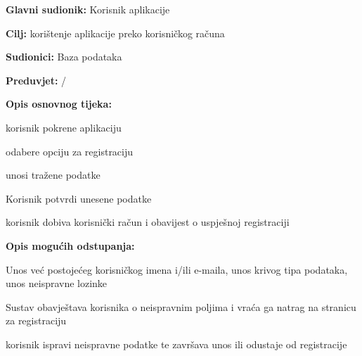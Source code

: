 				
				\noindent {}
			\begin{packed_item}
				
				\item \textbf{Glavni sudionik: }$ $Korisnik aplikacije$ $
				\item  \textbf{Cilj:} $ $korištenje aplikacije preko korisničkog računa$ $
				\item  \textbf{Sudionici:} $ $Baza podataka$ $
				\item  \textbf{Preduvjet:} $ $/$ $
				\item  \textbf{Opis osnovnog tijeka:}
				
				\item[] \begin{packed_enum}
					
					\item $ $korisnik pokrene aplikaciju$ $
					\item $ $odabere opciju za registraciju$ $
					\item $ $unosi tražene podatke$ $
					\item $ $Korisnik potvrdi unesene podatke$ $
					\item $ $korisnik dobiva korisnički račun i obavijest o uspješnoj registraciji$ $
				\end{packed_enum}
				
				\item  \textbf{Opis mogućih odstupanja:}
				
				\item[] \begin{packed_item}
					
					\item[3.a] $ $Unos već postojećeg korisničkog imena i/ili e-maila, unos krivog tipa podataka, unos neispravne lozinke$ $
					\item[] \begin{packed_enum}
						
						\item $ $Sustav obavještava korisnika o neispravnim poljima i vraća ga natrag na stranicu za registraciju$ $
						\item $ $korisnik ispravi neispravne podatke te završava unos ili odustaje od registracije$ $
						
					\end{packed_enum}
				\end{packed_item}
			\end{packed_item}
		
